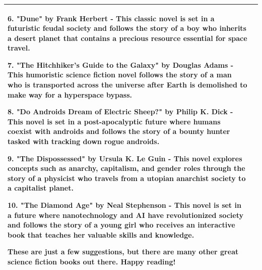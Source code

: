 \begin{table}[t]
\begin{tabular}{p{1em}l}
\begin{minipage}{40em}
\begin{lmttfont}
6. "Dune" by Frank Herbert - This classic novel is set in a futuristic feudal society and follows the story of a boy who inherits a desert planet that contains a precious resource essential for space travel.

7. "The Hitchhiker's Guide to the Galaxy" by Douglas Adams - This humoristic science fiction novel follows the story of a man who is transported across the universe after Earth is demolished to make way for a hyperspace bypass.

8. "Do Androids Dream of Electric Sheep?" by Philip K. Dick - This novel is set in a post-apocalyptic future where humans coexist with androids and follows the story of a bounty hunter tasked with tracking down rogue androids.

9. "The Dispossessed" by Ursula K. Le Guin - This novel explores concepts such as anarchy, capitalism, and gender roles through the story of a physicist who travels from a utopian anarchist society to a capitalist planet.

10. "The Diamond Age" by Neal Stephenson - This novel is set in a future where nanotechnology and AI have revolutionized society and follows the story of a young girl who receives an interactive book that teaches her valuable skills and knowledge.

These are just a few suggestions, but there are many other great science fiction books out there. Happy reading!
\end{lmttfont}
   \end{minipage}\\
\bottomrule
  \end{tabular}

\end{table}


